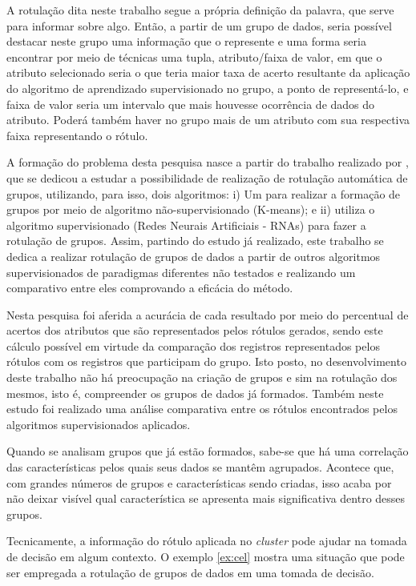A rotulação dita neste trabalho segue a própria definição da palavra, que serve para informar sobre algo. Então, a partir de um grupo de dados, seria possível destacar neste grupo uma informação que o represente e uma forma seria encontrar por meio de técnicas uma tupla, atributo/faixa de valor, em que o atributo selecionado seria o que teria maior taxa de acerto resultante da aplicação do algoritmo de aprendizado supervisionado no grupo, a ponto de representá-lo, e faixa de valor seria um intervalo que mais houvesse ocorrência de dados do atributo. Poderá também haver no grupo mais de um atributo com sua respectiva faixa representando o rótulo. 



A formação do problema desta pesquisa nasce a partir do trabalho realizado por , que se dedicou a estudar a possibilidade de realização de rotulação automática de grupos, utilizando, para isso, dois algoritmos: i) Um para realizar a formação de grupos por meio de algoritmo não-supervisionado (K-means); e ii) utiliza o algoritmo supervisionado (Redes Neurais Artificiais - RNAs) para fazer a rotulação de grupos. Assim, partindo do estudo já realizado, este trabalho se dedica a realizar rotulação de grupos de dados a partir de outros algoritmos supervisionados de paradigmas diferentes não testados e realizando um comparativo entre eles comprovando a eficácia do método. 

Nesta pesquisa foi aferida a acurácia de cada resultado por meio do percentual de acertos dos atributos que são representados pelos rótulos gerados, sendo este cálculo possível em virtude da comparação dos registros representados pelos rótulos com os registros que participam do grupo. Isto posto, no desenvolvimento deste trabalho não há preocupação na criação de grupos e sim na rotulação dos mesmos, isto é, compreender os grupos de dados já formados. Também neste estudo foi realizado uma análise comparativa entre os rótulos encontrados pelos algoritmos supervisionados aplicados.


Quando se analisam grupos que já estão formados, sabe-se que há uma correlação das características pelos quais seus dados se mantêm agrupados. Acontece que, com grandes números de grupos e características sendo criadas, isso acaba por não deixar visível qual característica se apresenta mais significativa dentro desses grupos.

Tecnicamente, a informação do rótulo aplicada no \textit{cluster} pode ajudar na tomada de decisão em algum contexto. O exemplo \ref{ex:cel} mostra uma situação que pode ser empregada a rotulação de grupos de dados em uma tomada de decisão.

